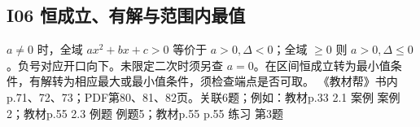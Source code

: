 \par\medskip\noindent\begin{minipage}{\linewidth}\subsection{I06 恒成立、有解与范围内最值}
$a\ne0$ 时，全域 $ax^2+bx+c>0$ 等价于 $a>0,\Delta<0$；全域 $\ge0$ 则 $a>0,\Delta\le0$。负号对应开口向下。未限定二次时须另查 $a=0$。在区间恒成立转为最小值条件，有解转为相应最大或最小值条件，须检查端点是否可取。
{\small 《教材帮》书内p.71、72、73；PDF第80、81、82页。关联6题；例如：教材p.33 2.1 案例 案例2；教材p.55 2.3 例题 例题5；教材p.55 p.55 练习 第3题}\par\end{minipage}\par
